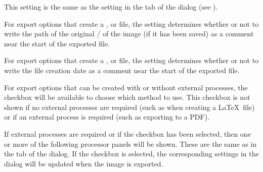 
This setting is the same as the
 setting in the
 tab of the  dialog
(see ).


For export options that create a ,  or 
file, the  setting determines whether
or not to write the path of the original \slash{} of
the image (if it has been saved) as a comment near the start of the
exported file.


For export options that create a ,  or 
file, the  setting determines whether
or not to write the file creation date as a comment near the start
of the exported file.


For export options that can be created with or without external
processes, the  checkbox will be
available to choose which method to use. This checkbox is not
shown if no external processes are required (such as when creating a
\LaTeX\ file) or if an external process is required (such as
exporting to a PDF).


If external processes are required or if the
 checkbox has been selected, then one or
more of the following processor panels will be shown. These are the
same as in the  tab of the 
dialog.
If the  checkbox is selected, the
corresponding settings in the  dialog will be
updated when the image is exported.

